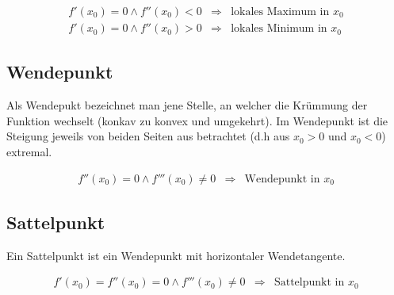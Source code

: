 \[ \boxed{ \begin{matrix}
f'(x_0) = 0 \land f''(x_0) < 0 & \Rightarrow & \text{lokales Maximum in $x_0$} \\
f'(x_0) = 0 \land f''(x_0) > 0 & \Rightarrow & \text{lokales Minimum in $x_0$} 
\end{matrix} } \]

\subsection{Wendepunkt}
Als Wendepukt bezeichnet man jene Stelle, an welcher die Krümmung der Funktion wechselt (konkav zu konvex und umgekehrt).
Im Wendepunkt ist die Steigung jeweils von beiden Seiten aus betrachtet (d.h aus $x_0 > 0$ und $x_0<0$) extremal.

\[ \boxed{ \begin{matrix}
f''(x_0) = 0 \land f'''(x_0) \neq 0 & \Rightarrow & \text{Wendepunkt in $x_0$}
\end{matrix} } \]

\subsection{Sattelpunkt}
Ein Sattelpunkt ist ein Wendepunkt mit horizontaler Wendetangente.

\[ \boxed{ \begin{matrix}
f'(x_0) =  f''(x_0) = 0 \land f'''(x_0) \neq 0 & \Rightarrow & \text{Sattelpunkt in $x_0$}
\end{matrix} } \]